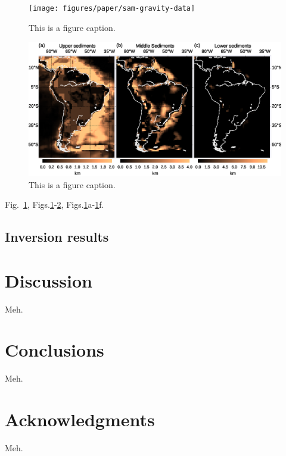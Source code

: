 \documentclass[extra,mreferee]{gji}
\newcommand{\fig}[1]{Fig.~\ref{fig:#1}}
\newcommand{\figs}[2]{Figs.\ref{fig:#1}-\ref{fig:#2}}
\newcommand{\subfigs}[3]{Figs.\ref{fig:#1}#2-\ref{fig:#1}#3}
\begin{document}
\begin{figure}
    \centering
    \texttt{[image: figures/paper/sam-gravity-data]}
    \caption{This is a figure caption.}
    \label{fig:sam-data}
\end{figure}

\begin{figure}
    \centering
    \includegraphics[width=\textwidth]{figures/paper/sam-gravity-sed}
    \caption{This is a figure caption.}
    \label{fig:sam-sed}
\end{figure}

\fig{sam-data}, \figs{sam-data}{sam-sed}, \subfigs{sam-data}{a}{f}.

\subsection{Inversion results}

\section{Discussion}

Meh.

\section{Conclusions}

Meh.

\section{Acknowledgments}

Meh.



\end{document}

